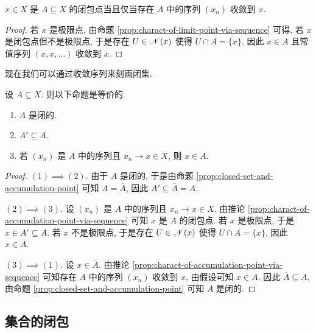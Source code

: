 \begin{corollary}\label{prop:charact-of-accumulation-point-via-sequence}
    \(x \in X\) 是 \(A \subseteq X\) 的闭包点当且仅当存在 \(A\) 中的序列 \((x_n)\) 收敛到 \(x\).
\end{corollary}

\begin{proof}
    若 \(x\) 是极限点, 由命题 \ref{prop:charact-of-limit-point-via-sequence} 可得. 若 \(x\) 是闭包点但不是极限点, 于是存在 \(U \in \mathscr N(x)\) 使得 \(U \cap A = \{x\}\). 因此 \(x \in A\) 且常值序列 \((x, x, \ldots)\) 收敛到 \(x\).
\end{proof}

现在我们可以通过收敛序列来刻画闭集.

\begin{proposition}\label{prop:charact-of-closed-set-via-sequence}
    设 \(A \subseteq X\). 则以下命题是等价的.
    \begin{enumerate}
        \item \(A\) 是闭的.
        \item \(A' \subseteq A\).
        \item 若 \((x_n)\) 是 \(A\) 中的序列且 \(x_n \to x \in X\), 则 \(x \in A\).
    \end{enumerate}
\end{proposition}

\begin{proof}
    \((1) \implies (2)\). 由于 \(A\) 是闭的, 于是由命题 \ref{prop:closed-set-and-accumulation-point} 可知 \(A = \overline A\), 因此 \(A' \subseteq \overline A = A\).

    \((2) \implies (3)\). 设 \((x_n)\) 是 \(A\) 中的序列且 \(x_n \to x \in X\). 由推论 \ref{prop:charact-of-accumulation-point-via-sequence} 可知 \(x\) 是 \(A\) 的闭包点. 若 \(x\) 是极限点, 于是 \(x \in A' \subseteq A\). 若 \(x\) 不是极限点, 于是存在 \(U \in \mathscr N(x)\) 使得 \(U \cap A = \{x\}\), 因此 \(x \in A\).

    \((3) \implies (1)\). 设 \(x \in \overline A\). 由推论 \ref{prop:charact-of-accumulation-point-via-sequence} 可知存在 \(A\) 中的序列 \((x_n)\) 收敛到 \(x\), 由假设可知 \(x \in A\). 因此 \(\overline A \subseteq A\), 由命题 \ref{prop:closed-set-and-accumulation-point} 可知 \(A\) 是闭的.
\end{proof}

\subsection{集合的闭包}

